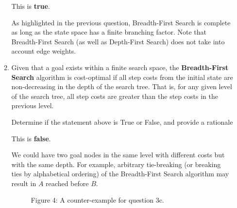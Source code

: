 \begin{enumerate}
\begin{enumerate}
        \begin{solution}
            This is \textbf{true}. 
            
            As highlighted in the previous question, Breadth-First Search is complete as long as the state space has a finite branching factor. Note that Breadth-First Search (as well as Depth-First Search) does not take into account edge weights.
        \end{solution}

        \item Given that a goal exists within a finite search space, the \textbf{Breadth-First Search} algorithm is cost-optimal if all step costs from the initial state are non-decreasing in the depth of the search tree. That is, for any given level of the search tree, all step costs are greater than the step costs in the previous level.

        Determine if the statement above is True or False, and provide a rationale

        \begin{solution}
            This is \textbf{false}. 
            
            We could have two goal nodes in the same level with different costs but with the same depth. For example, arbitrary tie-breaking (or breaking ties by alphabetical ordering) of the Breadth-First Search algorithm may result in $A$ reached before $B$.

            \begin{figure}[ht!]
                \centering

                \tikzexternalenable
                \tikzexternaldisable

                \caption*{\color{primary}Figure 4: A counter-example for question 3c.}
            \end{figure}
        \end{solution}
    \end{enumerate}


\end{enumerate}
